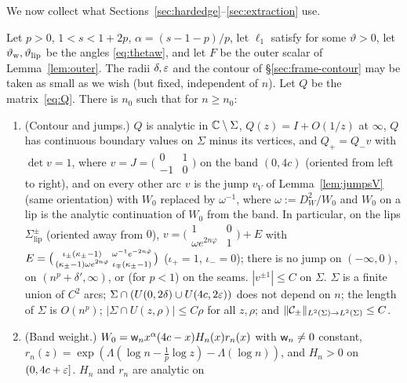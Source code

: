 \medskip
We now collect what Sections~\ref{sec:hardedge}--\ref{sec:extraction} use.

\begin{proposition}\label{prop:frame}
Let $p>0$, $1<s<1+2p$, $\alpha=(s-1-p)/p$, let $\ell_1$ satisfy \Ath{\vartheta} for some $\vartheta>0$, let $\vartheta_{\mathrm{w}},\vartheta_{\mathrm{lip}}$ be the angles
\eqref{eq:thetaw}, and let $F$ be the outer scalar of
Lemma~\ref{lem:outer}. The radii $\delta,\varepsilon$ and the contour of \S\ref{sec:frame-contour} may be taken as small as we
wish (but fixed, independent of $n$). Let $Q$ be the matrix~\eqref{eq:Q}. There is $n_0$ such that for $n\ge n_0$:
\begin{enumerate}
\item[\Fi1] (Contour and jumps.) $Q$ is analytic in $\mathbb{C}\setminus\Sigma$, $Q(z)=I+O(1/z)$ at $\infty$, $Q$ has continuous boundary
  values on $\Sigma$ minus its vertices, and $Q_+=Q_-v$ with $\det v=1$, where $v=J=\bigl(\begin{smallmatrix}0&1\\-1&0
  \end{smallmatrix}\bigr)$ on the band $(0,4c)$ (oriented from left to right), and on every other arc $v$ is the jump $v_V$
  of Lemma~\ref{lem:jumpsV} (same orientation) with $W_0$ replaced by $\omega^{-1}$, where $\omega:=D_W^2/W_0$ and $W_0$ on a lip is the
  analytic continuation of $W_0$ from the band. In particular, on the lips $\Sigma^\pm_{\mathrm{lip}}$ (oriented away from
  $0$), $v=\bigl(\begin{smallmatrix}1&0\\\omega e^{2n\varphi}&1\end{smallmatrix}\bigr)+E$ with
  $E=\bigl(\begin{smallmatrix}\iota_\pm(\kappa_\pm-1)&\omega^{-1}e^{-2n\tilde\varphi}\\(\kappa_\pm-1)\omega e^{2n\varphi}&\iota_\mp(\kappa_\pm-1)\end{smallmatrix}\bigr)$
  ($\iota_+=1$, $\iota_-=0$); there is no jump on $(-\infty,0)$, on $(n^p+\delta',\infty)$, or (for $p<1$) on the seams.
  $|v^{\pm1}|\le C$ on $\Sigma$. $\Sigma$ is a finite union of $C^2$ arcs; $\Sigma\cap(U(0,2\delta)\cup U(4c,2\varepsilon))$ does not
  depend on $n$; the length of $\Sigma$ is $O(n^p)$; $|\Sigma\cap U(z,\rho)|\le C\rho$ for all $z,\rho$; and
  $\|\mathcal{C}_\pm\|_{L^2(\Sigma)\to L^2(\Sigma)}\le C$.
\item[\Fi2] (Band weight.) $W_0=\mathsf w_n x^\alpha(4c-x)H_n(x)r_n(x)$ with $\mathsf w_n\ne0$ constant,
  $r_n(z)=\exp(\Lambda(\log n-\frac1p\log z)-\Lambda(\log n))$, and $H_n>0$ on $(0,4c+\varepsilon]$. $H_n$ and $r_n$ are analytic on

\end{enumerate}
\end{proposition}
